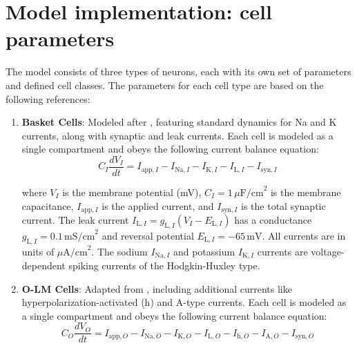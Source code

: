 \section{Model implementation: cell parameters}
The model consists of three types of neurons, each with its own set of
parameters and defined cell classes. The parameters for each cell type are
based on the following references:
\begin{enumerate}
    \item \textbf{Basket Cells}: Modeled after \textcite{wangGammaOscillationSynaptic1996},
          featuring standard dynamics for Na and K currents, along with synaptic and leak currents.
          Each cell is modeled as a single compartment and obeys the following current balance equation:
          \begin{equation}
              C_I \frac{dV_I}{dt} = I_{\text{app},I} - I_{\text{Na},I} - I_{\text{K},I} - I_{\text{L},I} - I_{\text{syn},I}
          \end{equation}

          where \(V_I\) is the membrane potential (mV), \(C_I = 1 \, \mu\text{F/cm}^2\)
          is the membrane capacitance, \(I_{\text{app},I}\) is the applied current, and
          \(I_{\text{syn},I}\) is the total synaptic current. The leak current
          \(I_{\text{L},I} = g_{\text{L},I}(V_I - E_{\text{L},I})\) has a conductance
          \(g_{\text{L},I} = 0.1 \, \text{mS/cm}^2\) and reversal potential
          \(E_{\text{L},I} = -65 \, \text{mV}\). All currents are in units of
          \(\mu\text{A/cm}^2\). The sodium \(I_{\text{Na},I}\) and potassium
          \(I_{\text{K},I}\) currents are voltage-dependent spiking currents of the
          Hodgkin-Huxley type.
    \item \textbf{O-LM Cells}: Adapted from \textcite{saragaActiveDendritesSpike2003},
          including additional currents like hyperpolarization-activated (h) and A-type currents.
          Each cell is modeled as a single compartment and obeys the following current balance equation:
          \begin{equation}
              C_O \frac{dV_O}{dt} = I_{\text{app},O} - I_{\text{Na},O} - I_{\text{K},O} - I_{\text{L},O} - I_{\text{h},O} - I_{\text{A},O} - I_{\text{syn},O}
          \end{equation}


\end{enumerate}

